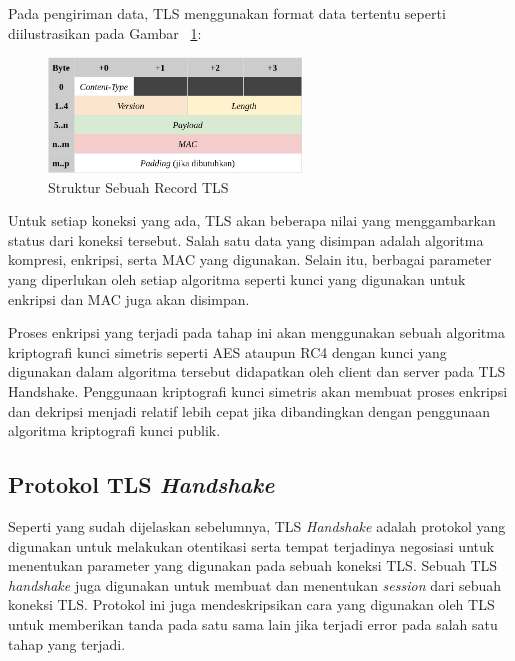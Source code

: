 Pada pengiriman data, TLS menggunakan format data tertentu seperti diilustrasikan pada Gambar ~\ref{fig:tls-record}:
\begin{figure}[h]
  \centering
  \includegraphics[width=0.6\textwidth]{resources/ch-2/tls-record.png}
  \caption{Struktur Sebuah Record TLS \protect\citep{rfc5246}}
  \label{fig:tls-record}
\end{figure}

Untuk setiap koneksi yang ada, TLS akan beberapa nilai yang menggambarkan status dari koneksi tersebut. Salah satu data yang disimpan adalah algoritma kompresi, enkripsi, serta MAC yang digunakan. Selain itu, berbagai parameter yang diperlukan oleh setiap algoritma seperti kunci yang digunakan untuk enkripsi dan MAC juga akan disimpan.

Proses enkripsi yang terjadi pada tahap ini akan menggunakan sebuah algoritma kriptografi kunci simetris seperti AES ataupun RC4 dengan kunci yang digunakan dalam algoritma tersebut didapatkan oleh client dan server pada TLS Handshake. Penggunaan kriptografi kunci simetris akan membuat proses enkripsi dan dekripsi menjadi relatif lebih cepat jika dibandingkan dengan penggunaan algoritma kriptografi kunci publik.

\subsection{Protokol TLS \textit{Handshake}}
Seperti yang sudah dijelaskan sebelumnya, TLS \textit{Handshake} adalah protokol yang digunakan untuk melakukan otentikasi serta tempat terjadinya negosiasi untuk menentukan parameter yang digunakan pada sebuah koneksi TLS. Sebuah TLS \textit{handshake} juga digunakan untuk membuat dan menentukan \textit{session} dari sebuah koneksi TLS. Protokol ini juga mendeskripsikan cara yang digunakan oleh TLS untuk memberikan tanda pada satu sama lain jika terjadi error pada salah satu tahap yang terjadi.

